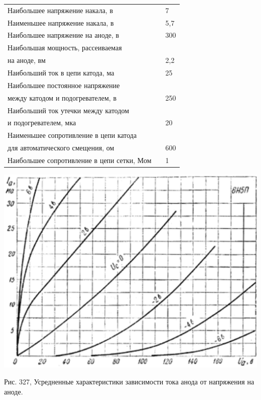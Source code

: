 \documentclass[12pt]{article}
\makeatletter
\renewcommand \dotfill {\leavevmode \cleaders \hb@xt@ 5mm{\hss .\hss }\hfill \kern \z@}
\makeatother
\begin{document}
    \begin{tabular}{p{105mm}l@{}l}
        Наибольшее напряжение накала, в \hspace{-3.3mm} \dotfill & \hspace{13mm} & 7 \\
        Наименьшее напряжение накала, в \hspace{-3.8mm} \dotfill & & 5,7 \\
        Наибольшее напряжение на аноде, в \dotfill & & 300 \\
        Наибольшая мощность, рассеиваемая \\
        \hspace{5mm} на аноде, вм \hspace{-7.2mm} \dotfill & & 2,2 \\
        Наибольший ток в цепи катода, ма \hspace{-3.9mm} \dotfill & & 25 \\
        Наибольшее постоянное напряжение \\
        \hspace{5mm} между катодом и подогревателем, в \hspace{-7mm} \dotfill & & 250 \\
        Наибольший ток утечки между катодом \\
        \hspace{5mm} и подогревателем, мка \hspace{-6.3mm} \dotfill & & 20 \\
        Наименьшее сопротивление в цепи катода \\
        \hspace{5mm} для автоматического смещения, ом \hspace{-5.5mm} \dotfill & & 600 \\
        Наибольшее сопротивление в цепи сетки, Мом \hspace{-5.5mm} \dotfill & & 1 \\
    \end{tabular}
    
    \vspace{5mm}
    \hspace{-5mm}
    \includegraphics[width=200mm]{graph.png}
    
    Рис. 327, Усредненные характеристики зависимости тока анода от напряжения на аноде.
\end{document}

